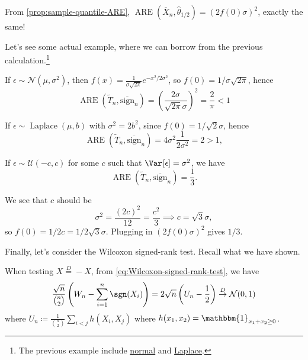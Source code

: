 \begin{prev}
	From \autoref{prop:sample-quantile-ARE}, \(\operatorname{ARE}(\overline{X} _n , \hat{\theta} _{1 / 2}) = (2 f(0) \sigma )^2\), exactly the same!
\end{prev}

Let's see some actual example, where we can borrow from the previous calculation.\footnote{The previous example include \hyperref[eg:ARE-normal]{normal} and \hyperref[eg:ARE-Laplace]{Laplace}.}

\begin{eg}[Gaussian]
	If \(\epsilon \sim \mathcal{N} (\mu , \sigma ^2)\), then \(f(x) = \frac{1}{\sigma \sqrt{2\pi } } e^{- x^2 / 2\sigma ^2}\), so \(f(0) = 1 / \sigma \sqrt{2\pi } \), hence
	\[
		\operatorname{ARE}(\widetilde{T} _n, \overline{\mathrm{sign}} _n)
		= \left( \frac{2\sigma }{\sqrt{2\pi } \sigma } \right) ^2
		= \frac{2}{\pi }
		< 1
	\]
\end{eg}

\begin{eg}[Laplace]
	If \(\epsilon \sim \operatorname{Laplace}(\mu , b) \) with \(\sigma ^2 = 2 b^2\), since \(f(0) = 1 /\sqrt{2} \sigma \), hence
	\[
		\operatorname{ARE}(\widetilde{T} _n, \overline{\mathrm{sign}} _n)
		= 4 \sigma ^2 \frac{1}{2 \sigma ^2}
		= 2
		> 1,
	\]
\end{eg}

\begin{eg}[Uniform]
	If \(\epsilon \sim \mathcal{U} (-c, c)\) for some \(c\) such that \(\Var_{}[\epsilon ] = \sigma ^2\), we have
	\[
		\operatorname{ARE}(\widetilde{T} _n, \overline{\mathrm{sign}} _n)
		= \frac{1}{3}.
	\]
\end{eg}
\begin{explanation}
	We see that \(c\) should be
	\[
		\sigma ^2
		= \frac{(2c)^2}{12}
		= \frac{c^2}{3}
		\implies c = \sqrt{3} \sigma ,
	\]
	so \(f(0) = 1 / 2c = 1 / 2 \sqrt{3} \sigma \). Plugging in \((2 f(0) \sigma )^2\) gives \(1 / 3\).
\end{explanation}

Finally, let's consider the Wilcoxon signed-rank test. Recall what we have shown.

\begin{prev}
	When testing \(X \overset{D}{=} -X\), from \autoref{eq:Wilcoxon-signed-rank-test}, we have
	\[
		\frac{\sqrt{n}}{\binom{n}{2}}  \left( W_n - \sum_{i=1}^{n} \sgn (X_i) \right)
		= 2 \sqrt{n} \left( U_n - \frac{1}{2} \right)
		\overset{D}{\to} \mathcal{N} (0, 1)
	\]
	where \(U_n \coloneqq \frac{1}{\binom{n}{2}} \sum_{i < j} h(X_i, X_j)\) where \(h(x_1, x_2) = \mathbbm{1}_{x_1 + x_2 \geq 0} \).
\end{prev}

